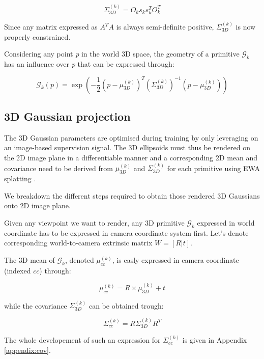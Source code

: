 \begin{equation}
    \Sigma^{(k)}_{3D} = O_{k}s_{k}s_{k}^{T}O_{k}^{T}
\end{equation}

Since any matrix expressed as $A^{T}A$ is always semi-definite positive, $\Sigma^{(k)}_{3D}$ is now properly constrained. 

Considering any point \textit{p} in the world 3D space, the geometry of a primitive $\mathcal{G}_{k}$ has an influence over \textit{p} that can be expressed through: 

\begin{equation}
  \mathcal{G}_{k}(p) = \exp \left(-\frac{1}{2}(p-\mu^{(k)}_{3D})^{T}(\Sigma^{(k)}_{3D})^{-1}(p-\mu^{(k)}_{3D})\right)
\end{equation}

\subsection{3D Gaussian projection} The 3D Gaussian parameters are optimised during training by only leveraging on an image-based supervision signal. The 3D ellipsoids must thus be rendered on the 2D image plane in a differentiable manner and a corresponding 2D mean and covariance need to be derived from $\mu^{(k)}_{3D}$ and $\Sigma^{(k)}_{3D}$ for each primitive using EWA splatting \citep{zwicker2001ewa}. 

We breakdown the different steps required to obtain those rendered 3D Gaussians onto 2D image plane. 

Given any viewpoint we want to render, any 3D primitive $\mathcal{G}_{k}$ expressed in world coordinate has to be expressed in camera coordinate system first. Let's denote corresponding world-to-camera extrinsic matrix $W=[R|t]$. 

The 3D mean of $\mathcal{G}_{k}$, denoted $\mu^{(k)}_{cc}$, is easly expressed in camera coordinate (indexed $cc$) through: 

\begin{equation}
  \mu^{(k)}_{cc} = R\times \mu^{(k)}_{3D}+t
\end{equation}

\noindent while the covariance $\Sigma^{(k)}_{3D}$ can be obtained trough: 

\begin{equation}
  \Sigma^{(k)}_{cc}= R\Sigma^{(k)}_{3D}R^{T}
  \label{eq:gs-3dcov-transfrom}
\end{equation}

The whole developement of such an expression for $\Sigma^{(k)}_{cc}$ is given in Appendix \ref{appendix:cov}. 

